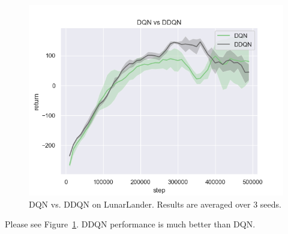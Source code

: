 \begin{figure}[htbp]
    \centering
    \includegraphics[width=0.5\linewidth]{figures/q2.png}
    \caption{DQN vs. DDQN on LunarLander. Results are averaged over 3 seeds.}
    \label{fig:q2}
\end{figure}

Please see Figure~\ref{fig:q2}. DDQN performance is much better than DQN.